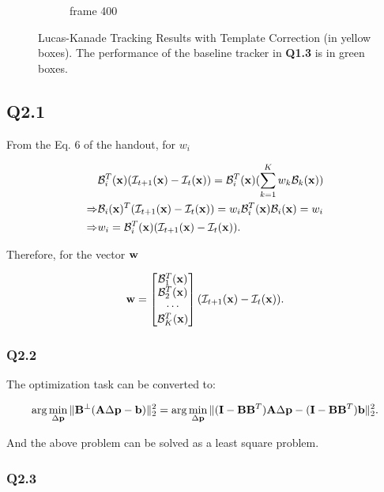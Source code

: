 \documentclass[11pt]{article}
\begin{document}
\begin{figure}[h!]
\begin{subfigure}{.195\textwidth}
      \caption{frame 400}
    \end{subfigure}\hfill
    \caption{Lucas-Kanade Tracking Results with Template Correction (in yellow boxes). The performance of the baseline tracker in \textbf{Q1.3} is in green boxes. }
    \label{fig:q1.4}
\end{figure}

\newpage
\subsection*{Q2.1}

From the Eq. 6 of the handout, for $w_i$

\begin{align}
    & \mathcal{B}_i^T(\mathbf{x})(\mathcal{I}_{t+1}(\mathbf{x}) - \mathcal{I}_t(\mathbf{x})) = \mathcal{B}_i^T(\mathbf{x})(\sum_{k=1}^K w_k \mathcal{B}_k (\mathbf{x}))\\
    \Rightarrow & \mathcal{B}_i(\mathbf{x})^T(\mathcal{I}_{t+1}(\mathbf{x}) - \mathcal{I}_t(\mathbf{x})) = w_i \mathcal{B}_i^T(\mathbf{x}) \mathcal{B}_i(\mathbf{x}) = w_i \\
    \Rightarrow & w_i = \mathcal{B}_i^T(\mathbf{x}) (\mathcal{I}_{t+1}(\mathbf{x}) - \mathcal{I}_t(\mathbf{x})).
\end{align}

Therefore, for the vector $\mathbf{w}$

\begin{equation}
    \mathbf{w} =
    \begin{bmatrix}
    \mathcal{B}_1^T (\mathbf{x}) \\ \mathcal{B}_2^T (\mathbf{x}) \\ \cdots \\ \mathcal{B}_K^T (\mathbf{x})
    \end{bmatrix}
    (\mathcal{I}_{t+1}(\mathbf{x}) - \mathcal{I}_t(\mathbf{x})).
\end{equation}

\newpage
\subsubsection*{Q2.2}

The optimization task can be converted to:

\begin{equation}
    \arg\min_{\Delta \mathbf{p}} \| \mathbf{B}^\bot(\mathbf{A}\Delta \mathbf{p} -\mathbf{b}) \|^2_2
    = \arg\min_{\Delta \mathbf{p}} \| (\mathbf{I}-\mathbf{B}\mathbf{B}^T)\mathbf{A}\Delta\mathbf{p} - (\mathbf{I}-\mathbf{B}\mathbf{B}^T)\mathbf{b}\|^2_2.
\end{equation}

And the above problem can be solved as a least square problem.

\newpage
\subsubsection*{Q2.3}
\end{document}
